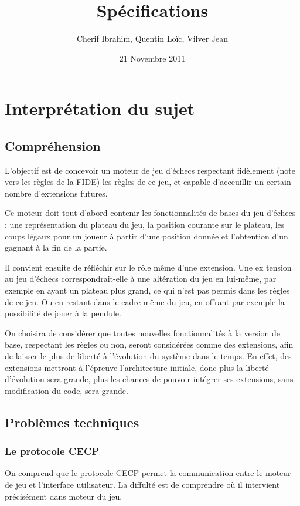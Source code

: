 \documentclass[11pt]{article}
\title{Spécifications}
\author{Cherif Ibrahim, Quentin Loïc, Vilver Jean}
\date{21 Novembre 2011}
\begin{document}
\maketitle

\setcounter{tocdepth}{3}
\tableofcontents
\vspace*{1cm}

\section{Interprétation du sujet}
\label{sec-1}
\subsection{Compréhension}
\label{sec-1-1}
L'objectif est de concevoir un moteur de jeu d'échecs respectant fidèlement (note vers les règles de la FIDE) les règles de ce jeu, et capable d'acceuillir un certain nombre d'extensions futures.

Ce moteur doit tout d'abord contenir les fonctionnalités de bases du jeu d'échecs : une représentation du plateau du jeu, la position courante sur le plateau, les coups légaux pour un joueur à partir d'une position donnée et l'obtention d'un gagnant à la fin de la partie.
   
Il convient ensuite de réfléchir sur le rôle même d'une extension. Une ex tension au jeu d'échecs correspondrait-elle à une altération du jeu en lui-même, par exemple en ayant un plateau plus grand, ce qui n'est pas permis dans les règles de ce jeu. Ou en restant dans le cadre même du jeu, en offrant par exemple la possibilité de jouer à la pendule.
   
On choisira de considérer que toutes nouvelles fonctionnalités à la version de base, respectant les règles ou non, seront considérées comme des extensions, afin de laisser le plus de liberté à l'évolution du système dans le temps. 
En effet, des extensions mettront à l'épreuve l'architecture initiale, donc plus la liberté d'évolution sera grande, plus les chances de pouvoir intégrer ses extensions, sans modification du code, sera grande.
\subsection{Problèmes techniques}
\label{sec-1-2}
\subsubsection{Le protocole CECP}
\label{sec-1-2-1}
On comprend que le protocole CECP permet la communication entre le moteur de jeu et l'interface utilisateur. La diffulté est de comprendre où il intervient précisément dans moteur du jeu.
\end{document}
